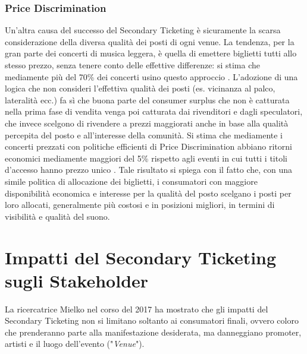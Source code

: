 \subsubsection{Price Discrimination}
Un'altra causa del successo del Secondary Ticketing è sicuramente la scarsa considerazione della diversa qualità dei posti di ogni venue. La tendenza, per la gran parte dei concerti di musica leggera, è quella di emettere biglietti tutti allo stesso prezzo, senza tenere conto delle effettive differenze: si stima che mediamente più del 70\% dei concerti usino questo approccio \cite{leslie2013resale, esteves2009price}. L'adozione di una logica che non consideri l'effettiva qualità dei posti (es. vicinanza al palco, lateralità ecc.) fa sì che buona parte del consumer surplus che non è catturata nella prima fase di vendita venga poi catturata dai rivenditori e dagli speculatori, che invece scelgono di rivendere a prezzi maggiorati anche in base alla qualità percepita del posto e all'interesse della comunità. 
Si stima che mediamente i concerti prezzati con politiche efficienti di Price Discrimination abbiano ritorni economici mediamente maggiori del 5\% rispetto agli eventi in cui tutti i titoli d'accesso hanno prezzo unico \cite{courty2012impact}. Tale risultato si spiega con il fatto che, con una simile politica di allocazione dei biglietti, i consumatori con maggiore disponibilità economica e interesse per la qualità del posto scelgano i posti per loro allocati, generalmente più costosi e in posizioni migliori, in termini di visibilità e qualità del suono. %

\section{Impatti del Secondary Ticketing sugli Stakeholder}
La ricercatrice Mielko nel corso del 2017 ha mostrato che gli impatti del Secondary Ticketing non si limitano soltanto ai consumatori finali, ovvero coloro che prenderanno parte alla manifestazione desiderata, ma danneggiano promoter, artisti e il luogo dell'evento ("\textit{Venue}").
